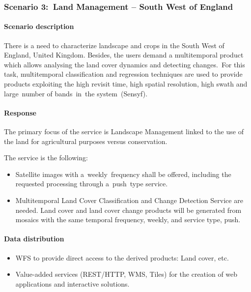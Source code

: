 \documentclass[a4paper]{article}
\newcommand\liststyleLFOvi{%
\renewcommand\labelitemi{[F0B7?]}
\renewcommand\labelitemii{o}
\renewcommand\labelitemiii{[F0A7?]}
\renewcommand\labelitemiv{[F0B7?]}
}
\newcommand\liststyleLFOxv{%
\renewcommand\labelitemi{[F0B7?]}
\renewcommand\labelitemii{o}
\renewcommand\labelitemiii{[F0A7?]}
\renewcommand\labelitemiv{[F0B7?]}
}
\begin{document}
\bigskip

\clearpage
\bigskip

\subsubsection[Scenario 3:\ Land Management {}-- South West of
England]{Scenario 3:\ Land Management -- South West of England}
\hypertarget{Toc381777196}{}\paragraph[Scenario description]{Scenario
description}
\foreignlanguage{english}{There is a need to characterize landscape and
crops in the South West of England, United Kingdom. Besides, the users
demand a multitemporal product which allows analysing the land cover
dynamics and detecting changes.\ }\foreignlanguage{english}{For this
task, multitemporal classification and regression techniques are used
to provide products exploiting the high revisit time, high spatial
resolution}\foreignlanguage{english}{, high swath and
large}\foreignlanguage{english}{\ number of
bands\ }\foreignlanguage{english}{in}\foreignlanguage{english}{\ }\foreignlanguage{english}{the
system\ }(Sensyf)\foreignlanguage{english}{.}

\paragraph[Response]{ Response}
The primary focus of the service is Landscape Management linked to the
use of the land for agricultural purposes versus conservation.\ 


\bigskip

The service is the following:


\bigskip

\liststyleLFOvi
\begin{itemize}
\item Satellite images with a\ weekly\ frequency shall be offered,
including the requested processing through a\ push\ type service.
\item \foreignlanguage{english}{Multitemporal Land Cover Classification
and Change Detection Service are needed. Land cover and land cover
change products will be generated from mosaics with the same temporal
frequency, weekly, and service type, push.}
\end{itemize}
\paragraph[Data distribution]{ Data
distribution}
\liststyleLFOxv
\begin{itemize}
\item WFS to provide direct access to the derived products: Land cover,
etc.
\item Value-added services (REST/HTTP, WMS, Tiles) for the creation of
web applications and interactive solutions.\ 
\end{itemize}
\end{document}
